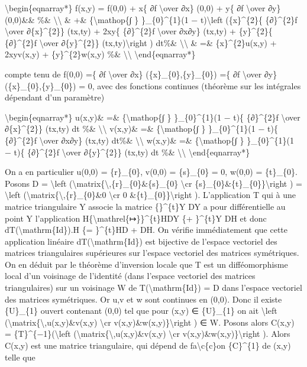 \documentclass[]{article}
\begin{document}
\textbackslash{}begin\{eqnarray*\} f(x,y) = f(0,0) + x\{ ∂f
\textbackslash{}over ∂x\} (0,0) + y\{ ∂f \textbackslash{}over ∂y\}
(0,0)\&\& \%\& \textbackslash{}\textbackslash{} \& +\&
\{\textbackslash{}mathop\{∫ \} \}\_\{0\}\^{}\{1\}(1 −
t)\textbackslash{}left (\{x\}\^{}\{2\}\{ \{∂\}\^{}\{2\}f
\textbackslash{}over ∂\{x\}\^{}\{2\}\} (tx,ty) + 2xy\{ \{∂\}\^{}\{2\}f
\textbackslash{}over ∂x∂y\} (tx,ty) + \{y\}\^{}\{2\}\{ \{∂\}\^{}\{2\}f
\textbackslash{}over ∂\{y\}\^{}\{2\}\} (tx,ty)\textbackslash{}right )
dt\%\& \textbackslash{}\textbackslash{} \& =\& \{x\}\^{}\{2\}u(x,y) +
2xyv(x,y) + \{y\}\^{}\{2\}w(x,y) \%\& \textbackslash{}\textbackslash{}
\textbackslash{}end\{eqnarray*\}

compte tenu de f(0,0) =\{ ∂f \textbackslash{}over ∂x\}
(\{x\}\_\{0\},\{y\}\_\{0\}) =\{ ∂f \textbackslash{}over ∂y\}
(\{x\}\_\{0\},\{y\}\_\{0\}) = 0, avec des fonctions continues (théorème
sur les intégrales dépendant d'un paramètre)

\textbackslash{}begin\{eqnarray*\} u(x,y)\& =\&
\{\textbackslash{}mathop\{∫ \} \}\_\{0\}\^{}\{1\}(1 − t)\{
\{∂\}\^{}\{2\}f \textbackslash{}over ∂\{x\}\^{}\{2\}\} (tx,ty) dt \%\&
\textbackslash{}\textbackslash{} v(x,y)\& =\&
\{\textbackslash{}mathop\{∫ \} \}\_\{0\}\^{}\{1\}(1 − t)\{
\{∂\}\^{}\{2\}f \textbackslash{}over ∂x∂y\} (tx,ty) dt\%\&
\textbackslash{}\textbackslash{} w(x,y)\& =\&
\{\textbackslash{}mathop\{∫ \} \}\_\{0\}\^{}\{1\}(1 − t)\{
\{∂\}\^{}\{2\}f \textbackslash{}over ∂\{y\}\^{}\{2\}\} (tx,ty) dt \%\&
\textbackslash{}\textbackslash{} \textbackslash{}end\{eqnarray*\}

On a en particulier u(0,0) = \{r\}\_\{0\}, v(0,0) = \{s\}\_\{0\} = 0,
w(0,0) = \{t\}\_\{0\}. Posons D = \textbackslash{}left
(\textbackslash{}matrix\{\textbackslash{},\{r\}\_\{0\}\&\{s\}\_\{0\}
\textbackslash{}cr \{s\}\_\{0\}\&\{t\}\_\{0\}\}\textbackslash{}right ) =
\textbackslash{}left
(\textbackslash{}matrix\{\textbackslash{},\{r\}\_\{0\}\&0
\textbackslash{}cr 0 \&\{t\}\_\{0\}\}\textbackslash{}right ).
L'application T qui à une matrice triangulaire Y associe la matrice
\{\}\^{}\{t\}Y DY a pour différentielle au point Y l'application
H\{\textbackslash{}mathrel\{↦\}\}\^{}\{t\}HDY \{+ \}\^{}\{t\}Y DH et
donc dT(\textbackslash{}mathrm\{Id\}).H \{= \}\^{}\{t\}HD + DH. On
vérifie immédiatement que cette application linéaire
dT(\textbackslash{}mathrm\{Id\}) est bijective de l'espace vectoriel des
matrices triangulaires supérieures sur l'espace vectoriel des matrices
symétriques. On en déduit par le théorème d'inversion locale que T est
un difféomorphisme local d'un voisinage de l'identité (dans l'espace
vectoriel des matrices triangulaires) sur un voisinage W de
T(\textbackslash{}mathrm\{Id\}) = D dans l'espace vectoriel des matrices
symétriques. Or u,v et w sont continues en (0,0). Donc il existe
\{U\}\_\{1\} ouvert contenant (0,0) tel que pour (x,y) ∈ \{U\}\_\{1\} on
ait \textbackslash{}left
(\textbackslash{}matrix\{\textbackslash{},u(x,y)\&v(x,y)
\textbackslash{}cr v(x,y)\&w(x,y)\}\textbackslash{}right ) ∈ W. Posons
alors C(x,y) = \{T\}\^{}\{−1\}(\textbackslash{}left
(\textbackslash{}matrix\{\textbackslash{},u(x,y)\&v(x,y)
\textbackslash{}cr v(x,y)\&w(x,y)\}\textbackslash{}right ). Alors C(x,y)
est une matrice triangulaire, qui dépend de fa\textbackslash{}c\{c\}on
\{C\}\^{}\{1\} de (x,y) telle que
\end{document}
